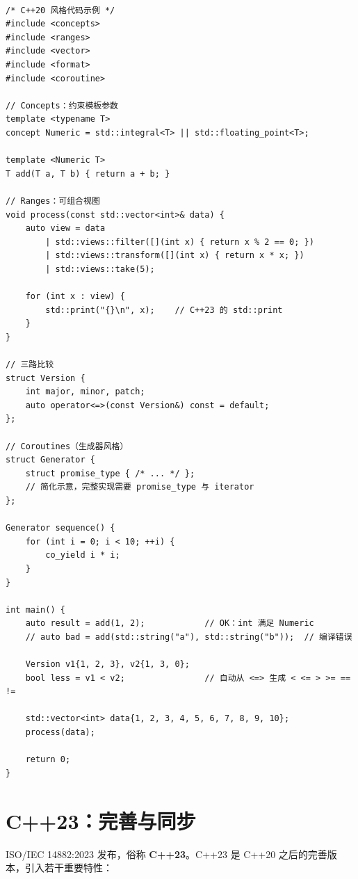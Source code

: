 \documentclass[12pt,a4paper,fontset=fandol]{ctexbook}
\newcommand{\cppxxlabel}[1]{%
  \tcbox[on line,colback=cppheadbg,colframe=cppheadbg,
    boxrule=0pt,arc=1pt,left=2pt,right=2pt,top=1pt,bottom=1pt,
    colupper=white,fontupper=\scriptsize\bfseries]{#1}}
\newcommand{\yearlabel}[1]{%
  \tcbox[on line,colback=yearheadbg,colframe=yearheadbg,
    boxrule=0pt,arc=1pt,left=3pt,right=3pt,top=1pt,bottom=1pt,
    colupper=white,fontupper=\scriptsize\bfseries]{#1}}
\newcommand{\yrlbl}[1]{\yearlabel{#1}}
\begin{document}
\cppxxlabel{C++20}\ \begin{lstlisting}
/* C++20 风格代码示例 */
#include <concepts>
#include <ranges>
#include <vector>
#include <format>
#include <coroutine>

// Concepts：约束模板参数
template <typename T>
concept Numeric = std::integral<T> || std::floating_point<T>;

template <Numeric T>
T add(T a, T b) { return a + b; }

// Ranges：可组合视图
void process(const std::vector<int>& data) {
    auto view = data
        | std::views::filter([](int x) { return x % 2 == 0; })
        | std::views::transform([](int x) { return x * x; })
        | std::views::take(5);

    for (int x : view) {
        std::print("{}\n", x);    // C++23 的 std::print
    }
}

// 三路比较
struct Version {
    int major, minor, patch;
    auto operator<=>(const Version&) const = default;
};

// Coroutines（生成器风格）
struct Generator {
    struct promise_type { /* ... */ };
    // 简化示意，完整实现需要 promise_type 与 iterator
};

Generator sequence() {
    for (int i = 0; i < 10; ++i) {
        co_yield i * i;
    }
}

int main() {
    auto result = add(1, 2);            // OK：int 满足 Numeric
    // auto bad = add(std::string("a"), std::string("b"));  // 编译错误

    Version v1{1, 2, 3}, v2{1, 3, 0};
    bool less = v1 < v2;                // 自动从 <=> 生成 < <= > >= == !=

    std::vector<int> data{1, 2, 3, 4, 5, 6, 7, 8, 9, 10};
    process(data);

    return 0;
}
\end{lstlisting}

\section{C++23：完善与同步}

\yrlbl{2023} ISO/IEC 14882:2023 发布，俗称 \textbf{C++23}。C++23 是 C++20 之后的完善版本，引入若干重要特性：
\end{document}

